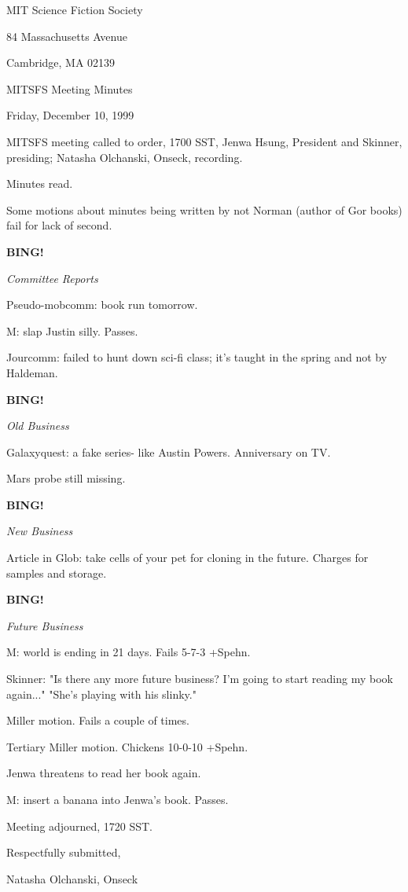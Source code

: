 \documentclass[12pt]{article}
\newcommand{\bing}{{\bf BING!} }
\newcommand{\goto}[1]{\bing \vskip 12pt \centerline{{\em{#1}}}}
\begin{document}
\begin{center}

MIT Science Fiction Society 

84 Massachusetts Avenue

Cambridge, MA 02139

\vspace{12pt}

MITSFS Meeting Minutes 

Friday, December 10, 1999

\end{center}
 
\vspace{18pt}

\setlength{\parskip}{6pt}

\noindent
MITSFS meeting called to order, 1700 SST,
Jenwa Hsung, President and Skinner, presiding; Natasha Olchanski, Onseck, recording.

Minutes read.

Some motions about minutes being written by not Norman (author of Gor books) fail for lack of second.

\goto{Committee Reports}

Pseudo-mobcomm: book run tomorrow.

M: slap Justin silly. Passes.

Jourcomm: failed to hunt down sci-fi class; it's taught in the spring and not by Haldeman.

\goto{Old Business}

Galaxyquest: a fake series- like Austin Powers. Anniversary on TV.

Mars probe still missing.

\goto{New Business}

Article in Glob: take cells of your pet for cloning in the future. Charges for samples and storage.

\goto{Future Business}

M: world is ending in 21 days. Fails 5-7-3 +Spehn.

Skinner: "Is there any more future business? I'm going to start reading my book again..." "She's playing with his slinky."

Miller motion. Fails a couple of times.

Tertiary Miller motion. Chickens 10-0-10 +Spehn.

Jenwa threatens to read her book again.

M: insert a banana into Jenwa's book. Passes.

\vspace{12pt}

\noindent
Meeting adjourned, 1720 SST.

\vspace{18pt}

\centerline{Respectfully submitted,}
\centerline{Natasha Olchanski, Onseck}
\end{document}
